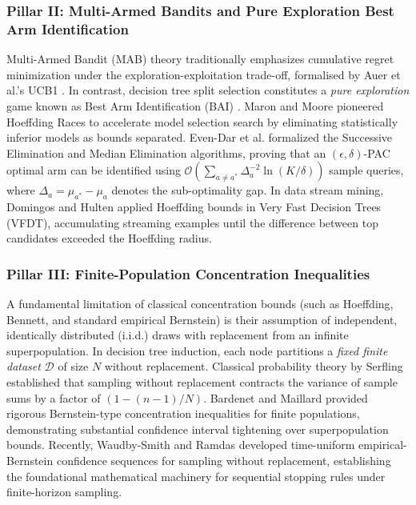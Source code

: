 \subsubsection{Pillar II: Multi-Armed Bandits and Pure Exploration Best Arm Identification}
Multi-Armed Bandit (MAB) theory traditionally emphasizes cumulative regret minimization under the exploration-exploitation trade-off, formalised by Auer et al.'s UCB1 \cite{auer2002finite}. In contrast, decision tree split selection constitutes a \textit{pure exploration} game known as Best Arm Identification (BAI) \cite{audibert2010best,kaufmann2016complexity}. Maron and Moore \cite{maron1994hoeffding} pioneered Hoeffding Races to accelerate model selection search by eliminating statistically inferior models as bounds separated. Even-Dar et al. \cite{evendar2006action} formalized the Successive Elimination and Median Elimination algorithms, proving that an $(\epsilon, \delta)$-PAC optimal arm can be identified using $\mathcal{O}\left(\sum_{a \neq a^*} \Delta_a^{-2} \ln(K/\delta)\right)$ sample queries, where $\Delta_a = \mu_{a^*} - \mu_a$ denotes the sub-optimality gap. In data stream mining, Domingos and Hulten \cite{domingos2000mining} applied Hoeffding bounds in Very Fast Decision Trees (VFDT), accumulating streaming examples until the difference between top candidates exceeded the Hoeffding radius.

\subsubsection{Pillar III: Finite-Population Concentration Inequalities}
A fundamental limitation of classical concentration bounds (such as Hoeffding, Bennett, and standard empirical Bernstein) is their assumption of independent, identically distributed (i.i.d.) draws with replacement from an infinite superpopulation. In decision tree induction, each node partitions a \textit{fixed finite dataset} $\mathcal{D}$ of size $N$ without replacement. Classical probability theory by Serfling \cite{serfling1974probability} established that sampling without replacement contracts the variance of sample sums by a factor of $(1 - (n-1)/N)$. Bardenet and Maillard \cite{bardenet2015concentration} provided rigorous Bernstein-type concentration inequalities for finite populations, demonstrating substantial confidence interval tightening over superpopulation bounds. Recently, Waudby-Smith and Ramdas \cite{waudbysmith2020confidence} developed time-uniform empirical-Bernstein confidence sequences for sampling without replacement, establishing the foundational mathematical machinery for sequential stopping rules under finite-horizon sampling.

